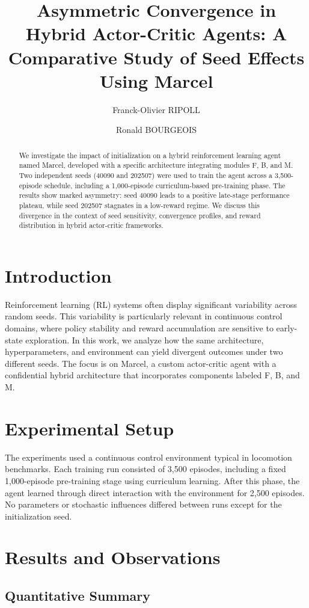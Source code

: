 \documentclass{article}
\title{Asymmetric Convergence in Hybrid Actor-Critic Agents: A Comparative Study of Seed Effects Using Marcel}
\author[1]{Franck-Olivier RIPOLL }
\author[2]{Ronald BOURGEOIS}
\affil[1]{Independent Researcher}
\affil[2]{Institution Name}
\date{}
\begin{document}
\maketitle

\begin{abstract}
We investigate the impact of initialization on a hybrid reinforcement learning agent named Marcel, developed with a specific architecture integrating modules F, B, and M. Two independent seeds (40090 and 202507) were used to train the agent across a 3,500-episode schedule, including a 1,000-episode curriculum-based pre-training phase. The results show marked asymmetry: seed 40090 leads to a positive late-stage performance plateau, while seed 202507 stagnates in a low-reward regime. We discuss this divergence in the context of seed sensitivity, convergence profiles, and reward distribution in hybrid actor-critic frameworks.
\end{abstract}

\section{Introduction}
Reinforcement learning (RL) systems often display significant variability across random seeds. This variability is particularly relevant in continuous control domains, where policy stability and reward accumulation are sensitive to early-state exploration. In this work, we analyze how the same architecture, hyperparameters, and environment can yield divergent outcomes under two different seeds. The focus is on Marcel, a custom actor-critic agent with a confidential hybrid architecture that incorporates components labeled F, B, and M.

\section{Experimental Setup}
The experiments used a continuous control environment typical in locomotion benchmarks. Each training run consisted of 3,500 episodes, including a fixed 1,000-episode pre-training stage using curriculum learning. After this phase, the agent learned through direct interaction with the environment for 2,500 episodes. No parameters or stochastic influences differed between runs except for the initialization seed.

\section{Results and Observations}
\subsection{Quantitative Summary}
\end{document}
